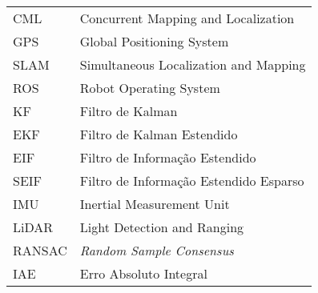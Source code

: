 \begin{longtable}{ll}
CML & Concurrent Mapping and Localization \\
GPS & Global Positioning System \\
SLAM & Simultaneous Localization and Mapping\\
ROS & Robot Operating System\\
KF & Filtro de Kalman\\
EKF & Filtro de Kalman Estendido\\
EIF & Filtro de Informação Estendido\\
SEIF & Filtro de Informação Estendido Esparso\\
IMU & Inertial Measurement Unit\\
LiDAR & Light Detection and Ranging\\
RANSAC & \textit{Random Sample Consensus} \\
IAE & Erro Absoluto Integral
\end{longtable}

